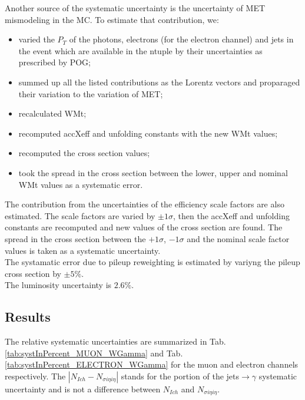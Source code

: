 Another source of the systematic uncertainty is the uncertainty of MET mismodeling in the MC. To estimate that contribution, we:
\begin{itemize}
  \item varied the $P_T$ of the photons, electrons (for the electron channel) and jets in the event which are available in the ntuple by their uncertainties as prescribed by POG;
  \item summed up all the listed contributions as the Lorentz vectors and proparaged their variation to the variation of MET;
  \item recalculated WMt;
  \item recomputed accXeff and unfolding constants with the new WMt values;
  \item recomputed the cross section values;
  \item took the spread in the cross section between the lower, upper and nominal WMt values as a systematic error.
\end{itemize}

The contribution from the uncertainties of the efficiency scale factors are also estimated. The scale factors are varied by $\pm 1\sigma$, then the accXeff and unfolding constants are recomputed and new values of the cross section are found. The spread in the cross section between the $+1\sigma$, $-1\sigma$ and the nominal scale factor values is taken as a systematic uncertainty.\\



The systamatic error due to pileup reweighting is estimated by variyng the pileup cross section by $\pm5\%$.\\

The luminosity uncertainty is $2.6\%$.\\

\subsection{Results}

The relative systematic uncertainties are summarized in Tab.\ref{tab:systInPercent_MUON_WGamma} and Tab. \ref{tab:systInPercent_ELECTRON_WGamma} for the muon and electron channels respectively. The $|N_{Ich}-N_{\sigma{i\eta i\eta}}|$ stands for the portion of the jets$\rightarrow\gamma$ systematic uncertainty and is not a difference between $N_{Ich}$ and $N_{\sigma{i\eta i\eta}}$.\\

